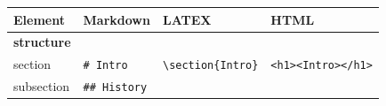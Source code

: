 \documentclass[10pt,fleqn]{wlpeerj}
\begin{document}
\begin{longtable}[]{@{}llll@{}}
\toprule
\begin{minipage}[b]{0.20\columnwidth}\raggedright\strut
\textbf{Element}
\strut\end{minipage}
&
\begin{minipage}[b]{0.17\columnwidth}\raggedright\strut
\textbf{Markdown}
\strut\end{minipage}
&
\begin{minipage}[b]{0.25\columnwidth}\raggedright\strut
\textbf{LATEX}
\strut\end{minipage}
&
\begin{minipage}[b]{0.27\columnwidth}\raggedright\strut
\textbf{HTML}
\strut\end{minipage}\tabularnewline
\midrule
\endhead
\begin{minipage}[t]{0.20\columnwidth}\raggedright\strut
\textbf{structure}
\strut\end{minipage}
&
\begin{minipage}[t]{0.17\columnwidth}\raggedright\strut
\strut\end{minipage}
&
\begin{minipage}[t]{0.25\columnwidth}\raggedright\strut
\strut\end{minipage}
&
\begin{minipage}[t]{0.27\columnwidth}\raggedright\strut
\strut\end{minipage}\tabularnewline
\begin{minipage}[t]{0.20\columnwidth}\raggedright\strut
section
\strut\end{minipage}
&
\begin{minipage}[t]{0.17\columnwidth}\raggedright\strut
\texttt{\#\ Intro}
\strut\end{minipage}
&
\begin{minipage}[t]{0.25\columnwidth}\raggedright\strut
\texttt{\textbackslash{}section\{Intro\}}
\strut\end{minipage}
&
\begin{minipage}[t]{0.27\columnwidth}\raggedright\strut
\texttt{\textless{}h1\textgreater{}\textless{}Intro\textgreater{}\textless{}/h1\textgreater{}}
\strut\end{minipage}\tabularnewline
\begin{minipage}[t]{0.20\columnwidth}\raggedright\strut
subsection
\strut\end{minipage}
&
\begin{minipage}[t]{0.17\columnwidth}\raggedright\strut
\texttt{\#\#\ History}
\strut\end{minipage}

\end{longtable}
\end{document}
